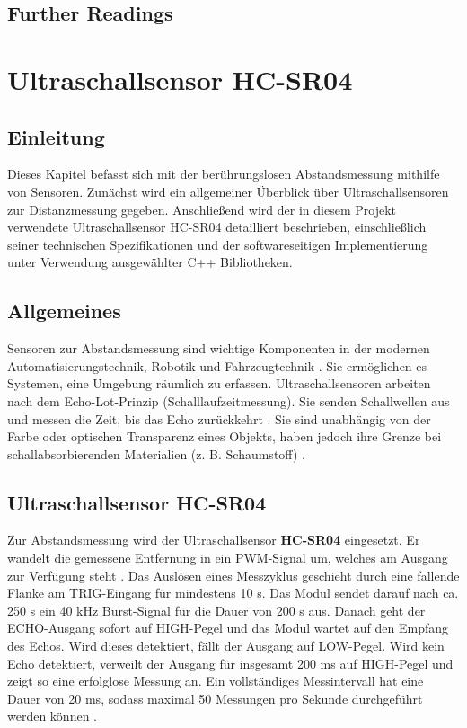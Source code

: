 %
%

\section{Further Readings}

\chapter{Ultraschallsensor HC-SR04}

\section*{Einleitung}
Dieses Kapitel befasst sich mit der berührungslosen Abstandsmessung mithilfe von Sensoren. Zunächst wird ein allgemeiner Überblick über Ultraschallsensoren zur Distanzmessung gegeben. Anschlie\ss end wird der in diesem Projekt verwendete Ultraschallsensor HC-SR04 detailliert beschrieben, einschließlich seiner technischen Spezifikationen und der softwareseitigen Implementierung unter Verwendung ausgewählter C++ Bibliotheken.

\section{Allgemeines}
Sensoren zur Abstandsmessung sind wichtige  Komponenten in der modernen Automatisierungstechnik, Robotik und Fahrzeugtechnik \cite{Fraden:2016}. Sie ermöglichen es Systemen, eine Umgebung räumlich zu erfassen. 
Ultraschallsensoren  arbeiten nach dem Echo-Lot-Prinzip (Schalllaufzeitmessung). Sie senden Schallwellen aus und messen die Zeit, bis das Echo zurückkehrt \cite{SparkFun:2020}. Sie sind unabhängig von der Farbe oder optischen Transparenz eines Objekts, haben jedoch ihre Grenze bei schallabsorbierenden Materialien (z. B. Schaumstoff) \cite{Fraden:2016}.

\section{Ultraschallsensor HC-SR04}
Zur Abstandsmessung wird der Ultraschallsensor \textbf{HC-SR04} eingesetzt. Er wandelt die gemessene Entfernung in ein PWM-Signal um, welches am Ausgang zur Verfügung steht \cite{KT:2012}. Das Auslösen eines Messzyklus geschieht durch eine fallende Flanke am TRIG-Eingang  für mindestens 10 \textmu s. Das Modul sendet darauf nach ca. 250 \textmu s ein 40 kHz Burst-Signal für die Dauer von 200 \textmu s aus. Danach geht der ECHO-Ausgang sofort auf HIGH-Pegel und das Modul wartet auf den Empfang des Echos. Wird dieses detektiert, fällt der Ausgang auf LOW-Pegel. Wird kein Echo detektiert, verweilt der Ausgang für insgesamt 200 ms auf HIGH-Pegel und zeigt so eine erfolglose Messung an. Ein vollständiges Messintervall hat eine Dauer von 20 ms, sodass maximal 50 Messungen pro Sekunde durchgeführt werden können \cite{KT:2012}.

